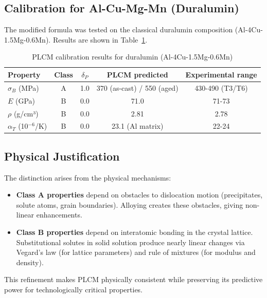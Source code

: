 \documentclass[12pt,a4paper]{article}
\begin{document}
	\subsection{Calibration for Al-Cu-Mg-Mn (Duralumin)}
	
	The modified formula was tested on the classical duralumin composition (Al-4Cu-1.5Mg-0.6Mn). Results are shown in Table~\ref{tab:duralumin-calibration}.
	
	\begin{table}[htbp]
		\centering
		\caption{PLCM calibration results for duralumin (Al-4Cu-1.5Mg-0.6Mn)}
		\label{tab:duralumin-calibration}
		\begin{tabular}{lcccc}
			\toprule
			\textbf{Property} & \textbf{Class} & \(\delta_P\) & \textbf{PLCM predicted} & \textbf{Experimental range} \\
			\midrule
			\(\sigma_B\) (MPa) & A & 1.0 & 370 (as-cast) / 550 (aged) & 430-490 (T3/T6) \\
			\(E\) (GPa) & B & 0.0 & 71.0 & 71-73 \\
			\(\rho\) (g/cm³) & B & 0.0 & 2.81 & 2.78 \\
			\(\alpha_T\) (10\(^{-6}\)/K) & B & 0.0 & 23.1 (Al matrix) & 22-24 \\
			\bottomrule
		\end{tabular}
	\end{table}
	
	\subsection{Physical Justification}
	
	The distinction arises from the physical mechanisms:
	\begin{itemize}
		\item \textbf{Class A properties} depend on obstacles to dislocation motion (precipitates, solute atoms, grain boundaries). Alloying creates these obstacles, giving non-linear enhancements.
		\item \textbf{Class B properties} depend on interatomic bonding in the crystal lattice. Substitutional solutes in solid solution produce nearly linear changes via Vegard's law (for lattice parameters) and rule of mixtures (for modulus and density).
	\end{itemize}
	
	This refinement makes PLCM physically consistent while preserving its predictive power for technologically critical properties.
	
	
\end{document}
